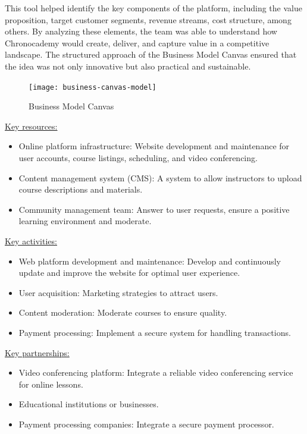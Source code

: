 This tool helped identify the key components of the platform, including the value proposition, target customer segments, revenue streams, cost structure, among others.
By analyzing these elements, the team was able to understand how Chronocademy would create, deliver, and capture value in a competitive landscape.
The structured approach of the Business Model Canvas ensured that the idea was not only innovative but also practical and sustainable.\newline
\begin{figure}[h]
    \centering
    \texttt{[image: business-canvas-model]}
    \caption{Business Model Canvas}
    \label{fig:figure1}
\end{figure}

\underline{Key resources:}
\begin{itemize}
    \item Online platform infrastructure: Website development and maintenance for user accounts, course listings, scheduling, and video conferencing.
    \item Content management system (CMS): A system to allow instructors to upload course descriptions and materials.
    \item Community management team: Answer to user requests, ensure a positive learning environment and moderate.
\end{itemize}

\underline{Key activities:}
\begin{itemize}
    \item Web platform development and maintenance: Develop and continuously update and improve the website for optimal user experience.
    \item User acquisition: Marketing strategies to attract users.
    \item Content moderation: Moderate courses to ensure quality.
    \item Payment processing: Implement a secure system for handling transactions.
\end{itemize}

\underline{Key partnerships:}
\begin{itemize}
    \item Video conferencing platform: Integrate a reliable video conferencing service for online lessons.
    \item Educational institutions or businesses.
    \item Payment processing companies: Integrate a secure payment processor.
\end{itemize}

